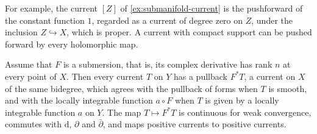 For example, the current $[Z]$ of \cref{ex:submanifold-current} is the pushforward of the constant function $1$, regarded as a current of degree zero on $Z$, under the inclusion $Z\hookrightarrow X$, which is proper. A current with compact support can be pushed forward by every holomorphic map.

\begin{proposition}\label{prop:submersion-current-pullback}
Assume that $F$ is a submersion, that is, its complex derivative has rank $n$ at every point of $X$. Then every current $T$ on $Y$ has a pullback $F^*T$, a current on $X$ of the same bidegree, which agrees with the pullback of forms when $T$ is smooth, and with the locally integrable function $a\circ F$ when $T$ is given by a locally integrable function $a$ on $Y$. The map $T\mapsto F^*T$ is continuous for weak convergence, commutes with $\mathrm d$, $\partial$ and $\bar\partial$, and maps positive currents to positive currents.
\end{proposition}
